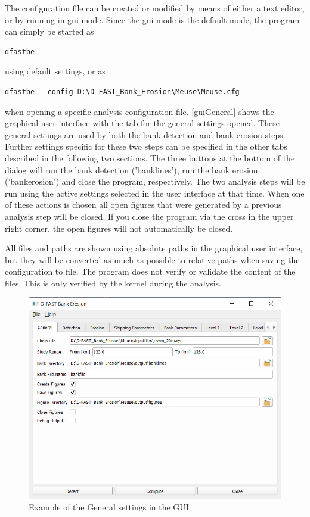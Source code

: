 The configuration file can be created or modified by means of either a text editor, or by \dfastbe running in gui mode.
Since the gui mode is the default mode, the program can simply be started as

\begin{Verbatim}
dfastbe
\end{Verbatim}

using default settings, or as

\begin{Verbatim}
dfastbe --config D:\D-FAST_Bank_Erosion\Meuse\Meuse.cfg
\end{Verbatim}

when opening a specific analysis configuration file.
\autoref{guiGeneral} shows the graphical user interface with the tab for the general settings opened.
These general settings are used by both the bank detection and bank erosion steps.
Further settings specific for these two steps can be specified in the other tabs described in the following two sections.
The three buttons at the bottom of the dialog will run the bank detection ('banklines'), run the bank erosion ('bankerosion') and close the program, respectively.
The two analysis steps will be run using the active settings selected in the user interface at that time.
When one of these actions is chosen all open figures that were generated by a previous analysis step will be closed.
If you close the program via the cross in the upper right corner, the open figures will not automatically be closed.

\Note All files and paths are shown using absolute paths in the graphical user interface, but they will be converted as much as possible to relative paths when saving the configuration to file.
The program does not verify or validate the content of the files.
This is only verified by the kernel during the analysis.

\begin{figure}
\center
\includegraphics[width=\textwidth]{figures/gui1.png}
\caption{Example of the General settings in the GUI}
\label{guiGeneral}
\end{figure}

